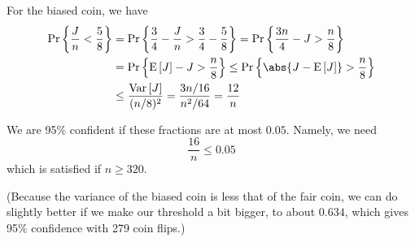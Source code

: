 \documentclass[12pt,twoside]{article}
\begin{document}
\begin{problem}{10}
{For the biased coin, we have
\begin{align*}
\pr{\frac{J}{n} < \frac{5}{8} } & =
  \pr{\frac{3}{4} - \frac{J}{n} > \frac{3}{4} - \frac{5}{8}}
  = \pr{\frac{3n}{4} - J > \frac{n}{8} } \\ 
  & = \pr{\expect{J} - J > \frac{n}{8} } \leq
                   \pr{\abs{J - \expect{J}} > \frac{n}{8}} \\
& \leq \frac{\variance{J}}{(n/8)^2} = \frac{3n/16}{n^2/64}
  = \frac{12}{n}
\end{align*}

We are 95\% confident if these fractions are at most $0.05$.  Namely, we
need
\[
\frac{16}{n} \leq 0.05
\]
which is satisfied if $n \geq 320$.

(Because the variance of the biased coin is less that of the fair coin, we
can do slightly better if we make our threshold a bit bigger, to about
$0.634$, which gives 95\% confidence with 279 coin flips.)
\fi
}
\end{problem}


\end{document}

